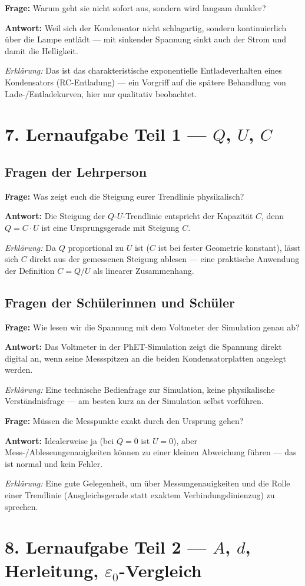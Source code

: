 \documentclass[11pt,a4paper]{article}
\newcommand{\Frage}[1]{\textbf{Frage:} #1\par}
\newcommand{\Antwort}[1]{\textbf{Antwort:} #1\par}
\newcommand{\Erklaerung}[1]{\textit{Erklärung:} #1}
\newcommand{\FrageBlock}[3]{\Frage{#1}\Antwort{#2}\Erklaerung{#3}\vspace{0.6em}}
\begin{document}
\FrageBlock{Warum geht sie nicht sofort aus, sondern wird langsam dunkler?}
{Weil sich der Kondensator nicht schlagartig, sondern kontinuierlich über die Lampe entlädt --- mit sinkender Spannung sinkt auch der Strom und damit die Helligkeit.}
{Das ist das charakteristische exponentielle Entladeverhalten eines Kondensators (RC-Entladung) --- ein Vorgriff auf die spätere Behandlung von Lade-/Entladekurven, hier nur qualitativ beobachtet.}

\section*{7. Lernaufgabe Teil 1 --- $Q$, $U$, $C$}

\subsection*{Fragen der Lehrperson}

\FrageBlock{Was zeigt euch die Steigung eurer Trendlinie physikalisch?}
{Die Steigung der $Q$-$U$-Trendlinie entspricht der Kapazität $C$, denn $Q=C\cdot U$ ist eine Ursprungsgerade mit Steigung $C$.}
{Da $Q$ proportional zu $U$ ist ($C$ ist bei fester Geometrie konstant), lässt sich $C$ direkt aus der gemessenen Steigung ablesen --- eine praktische Anwendung der Definition $C=Q/U$ als linearer Zusammenhang.}

\subsection*{Fragen der Schülerinnen und Schüler}

\FrageBlock{Wie lesen wir die Spannung mit dem Voltmeter der Simulation genau ab?}
{Das Voltmeter in der PhET-Simulation zeigt die Spannung direkt digital an, wenn seine Messspitzen an die beiden Kondensatorplatten angelegt werden.}
{Eine technische Bedienfrage zur Simulation, keine physikalische Verständnisfrage --- am besten kurz an der Simulation selbst vorführen.}

\FrageBlock{Müssen die Messpunkte exakt durch den Ursprung gehen?}
{Idealerweise ja (bei $Q=0$ ist $U=0$), aber Mess-/Ableseungenauigkeiten können zu einer kleinen Abweichung führen --- das ist normal und kein Fehler.}
{Eine gute Gelegenheit, um über Messungenauigkeiten und die Rolle einer Trendlinie (Ausgleichsgerade statt exaktem Verbindungslinienzug) zu sprechen.}

\section*{8. Lernaufgabe Teil 2 --- $A$, $d$, Herleitung, $\varepsilon_0$-Vergleich}
\end{document}
